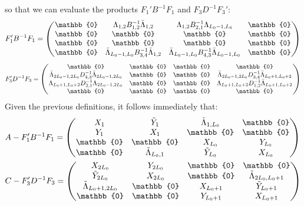 so that we can evaluate the products $F_1' B^{-1} F_1$ and $F_3 D^{-1} F_3'$:
\begin{equation}
    F_1' B^{-1} F_1 = \begin{pmatrix}
        \mathbb{0} & \Lambda_{1,2} B^{-1}_{1,2} \Bar{\Lambda}_{1,2} & \Lambda_{1,2} B^{-1}_{2,1} \Lambda_{L_0 - 1, L_0} & \mathbb{0} \\
        \mathbb{0} & \mathbb{0} & \mathbb{0} & \mathbb{0} \\
        \mathbb{0} & \mathbb{0} & \mathbb{0} & \mathbb{0} \\
        \mathbb{0} & \Bar{\Lambda}_{L_0 - 1, L_0} B_{3,4}^{-1} \Bar{\Lambda}_{1,2} & \Bar{\Lambda}_{L_0 - 1, L_0} B_{4,3}^{-1} \Bar{\Lambda}_{L_0 - 1,L_0} & \mathbb{0} \\
    \end{pmatrix}
\end{equation}
\begin{equation}
    F_3' D^{-1} F_3 = \begin{pmatrix}
        \mathbb{0} & \mathbb{0} & \mathbb{0} & \mathbb{0} \\
        \Bar{\Lambda}_{2L_0 - 1, 2L_0} D_{4,3}^{-1} \Bar{\Lambda}_{2L_0 - 1, 2L_0}  & \mathbb{0} & \mathbb{0} & \Bar{\Lambda}_{2L_0 - 1, 2L_0} D_{3,4}^{-1} \Bar{\Lambda}_{L_0 + 1, L_0 + 2} \\
        \Lambda_{L_0 + 1, L_0 + 2} D^{-1}_{2,1} \Lambda_{2L_0 - 1, 2L_0} & \mathbb{0} & \mathbb{0} & \Lambda_{L_0 + 1, L_0 + 2} D^{-1}_{1,2} \Bar{\Lambda}_{L_0 + 1, L_0 + 2} \\
        \mathbb{0} & \mathbb{0} & \mathbb{0} & \mathbb{0} \\
    \end{pmatrix}
\end{equation}
Given the previous definitions, it follows immediately that:
\begin{equation}
\begin{split}
    &A - F_1' B^{-1} F_1 = \begin{pmatrix}
        X_1 & \Tilde{Y}_1 & \Tilde{\Lambda}_{1, L_0} & \mathbb{0} \\
        Y_1 & X_1 & \mathbb{0} & \mathbb{0} \\
        \mathbb{0} & \mathbb{0} & X_{L_0} & Y_{L_0} \\
        \mathbb{0} & \Tilde{\Lambda}_{L_0, 1} & \Tilde{Y}_{L_0} & X_{L_0} \\
    \end{pmatrix} \\ &C - F_3' D^{-1} F_3 = \begin{pmatrix}
        X_{2L_0} & Y_{2L_0} & \mathbb{0} & \mathbb{0} \\
        \Tilde{Y}_{2L_0} & X_{2L_0} & \mathbb{0} & \Tilde{\Lambda}_{2L_0, L_0 + 1} \\
        \Tilde{\Lambda}_{L_0 + 1, 2L_0} & \mathbb{0} & X_{L_0 + 1} & \Tilde{Y}_{L_0 + 1} \\
        \mathbb{0} & \mathbb{0} & Y_{L_0 + 1} & X_{L_0 + 1} \\
    \end{pmatrix}
    \end{split}
\end{equation}
